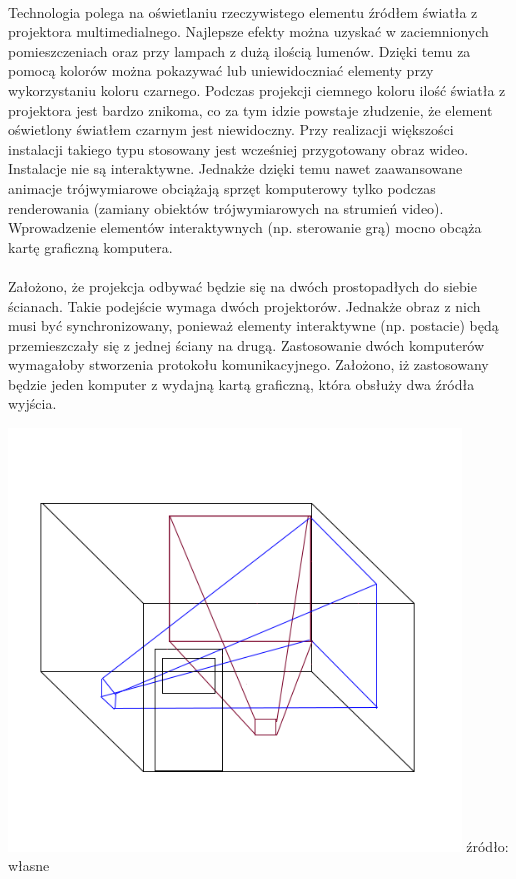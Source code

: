 \paragraph{}
Technologia polega na oświetlaniu rzeczywistego elementu  źródłem światła z projektora multimedialnego. Najlepsze efekty można uzyskać w zaciemnionych pomieszczeniach oraz przy lampach z dużą ilością lumenów. Dzięki temu za pomocą kolorów można pokazywać lub uniewidoczniać elementy przy wykorzystaniu koloru czarnego. Podczas projekcji ciemnego koloru ilość światła z projektora jest bardzo znikoma, co za tym idzie powstaje złudzenie, że element oświetlony światłem czarnym jest niewidoczny.
Przy realizacji większości instalacji takiego typu stosowany jest wcześniej przygotowany obraz wideo. Instalacje nie są interaktywne. Jednakże dzięki temu nawet zaawansowane animacje trójwymiarowe obciążają sprzęt komputerowy tylko podczas renderowania (zamiany obiektów trójwymiarowych na strumień video). Wprowadzenie elementów interaktywnych (np. sterowanie grą) mocno obcąża kartę graficzną komputera.
\paragraph{}
Założono, że projekcja odbywać będzie się na dwóch prostopadłych do siebie ścianach. Takie podejście wymaga dwóch projektorów. Jednakże obraz z nich musi być synchronizowany, ponieważ elementy interaktywne (np. postacie) będą przemieszczały się z jednej ściany na drugą. Zastosowanie dwóch komputerów wymagałoby stworzenia protokołu komunikacyjnego. Założono, iż zastosowany będzie jeden komputer z wydajną kartą graficzną, która obsłuży dwa źródła wyjścia.

\begin{center}
\includegraphics[width=0.9\textwidth]{images/mappingv1.png}
\small {źródło: własne }
\end{center}

